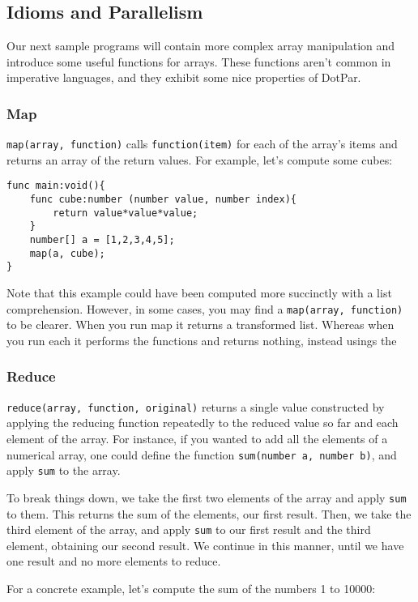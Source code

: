 \subsection{Idioms and Parallelism}
Our next sample programs will contain more complex array manipulation and introduce some useful functions for arrays. These functions aren't common in imperative languages, and they exhibit some nice properties of DotPar.

\subsubsection{Map}
\verb=map(array, function)= calls \verb=function(item)= for each of the array's items and returns an array of the return values.  For example, let's compute some cubes:

\begin{verbatim}
func main:void(){
    func cube:number (number value, number index){
        return value*value*value;
    }
    number[] a = [1,2,3,4,5];
    map(a, cube);
}
\end{verbatim}

Note that this example could have been computed more succinctly with a list comprehension. However, in some cases, you may find a \verb=map(array, function)= to be clearer. When you run map it returns a transformed list. Whereas when you run each it performs the functions and returns nothing, instead usings the 

\subsubsection{Reduce}
\verb=reduce(array, function, original)= returns a single value constructed by applying the reducing function repeatedly to the reduced value so far and each element of the array. For instance, if you wanted to add all the elements of a numerical array, one could define the function \verb=sum(number a, number b)=, and apply \verb=sum= to the array.

To break things down, we take the first two elements of the array and apply \verb=sum= to them. This returns the sum of the elements, our first result. Then, we take the third element of the array, and apply \verb=sum= to our first result and the third element, obtaining our second result. We continue in this manner, until we have one result and no more elements to reduce.

For a concrete example, let's compute the sum of the numbers 1 to 10000:

